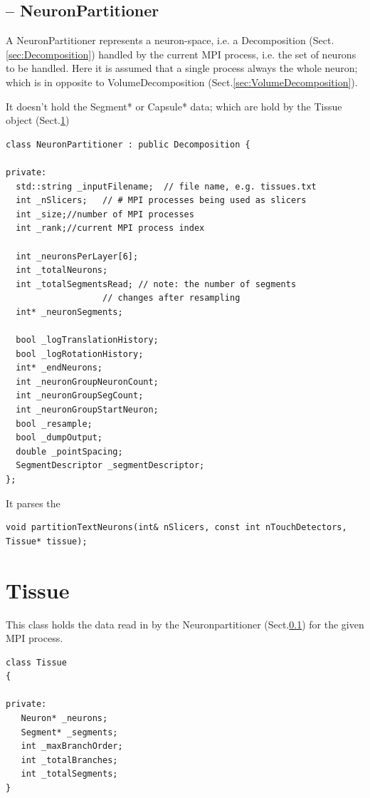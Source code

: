 \subsection{-- NeuronPartitioner}
\label{sec:NeuronPartitioner}

A NeuronPartitioner represents a neuron-space, i.e. a Decomposition
(Sect.\ref{sec:Decomposition}) handled by the current MPI process, i.e. the set
of neurons to be handled.
Here it is assumed that a single process always the whole neuron; which is in
opposite to VolumeDecomposition (Sect.\ref{sec:VolumeDecomposition}).


It doesn't hold the Segment* or Capsule* data; which are hold by the Tissue
object (Sect.\ref{sec:Tissue})

\begin{lstlisting}
class NeuronPartitioner : public Decomposition {

private:
  std::string _inputFilename;  // file name, e.g. tissues.txt
  int _nSlicers;   // # MPI processes being used as slicers
  int _size;//number of MPI processes
  int _rank;//current MPI process index
      
  int _neuronsPerLayer[6];
  int _totalNeurons;
  int _totalSegmentsRead; // note: the number of segments 
                   // changes after resampling
  int* _neuronSegments;

  bool _logTranslationHistory;
  bool _logRotationHistory;
  int* _endNeurons;
  int _neuronGroupNeuronCount;
  int _neuronGroupSegCount;
  int _neuronGroupStartNeuron;
  bool _resample;
  bool _dumpOutput;
  double _pointSpacing;
  SegmentDescriptor _segmentDescriptor;
};
\end{lstlisting}

It parses the 
\begin{verbatim}
void partitionTextNeurons(int& nSlicers, const int nTouchDetectors, Tissue* tissue);
\end{verbatim}



\section{Tissue}
\label{sec:Tissue}

This class holds the data read in by the Neuronpartitioner
(Sect.\ref{sec:NeuronPartitioner}) for the given MPI process.

\begin{lstlisting}
class Tissue
{

private:
   Neuron* _neurons;
   Segment* _segments;
   int _maxBranchOrder;
   int _totalBranches;
   int _totalSegments;
}
\end{lstlisting}

